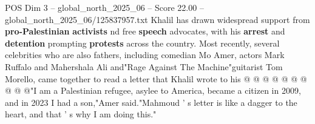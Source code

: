 \begin{textsample}{POS Dim 3 – global\_north\_2025\_06 – Score 22.00 – global\_north\_2025\_06/125837957.txt}
Khalil has drawn widespread support from \textbf{pro-Palestinian} \textbf{activists} nd free \textbf{speech} advocates, with his \textbf{arrest} and \textbf{detention} prompting \textbf{protests} across the country.
Most recently, several celebrities who are also fathers, including comedian Mo Amer, actors Mark Ruffalo and Mahershala Ali and"Rage Against The Machine"guitarist Tom Morello, came together to read a letter that Khalil wrote to his @ @ @ @ @ @ @ @ @ @"I am a Palestinian refugee, asylee to America, became a citizen in 2009, and in 2023 I had a son,"Amer said."Mahmoud ' s letter is like a dagger to the heart, and that ' s why I am doing this."

\end{textsample}
